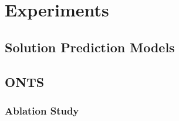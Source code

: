 

\chapter{Experiments}\label{chap:experiments}

\section{Solution Prediction Models}

\section{ONTS}

\subsection{Ablation Study}

